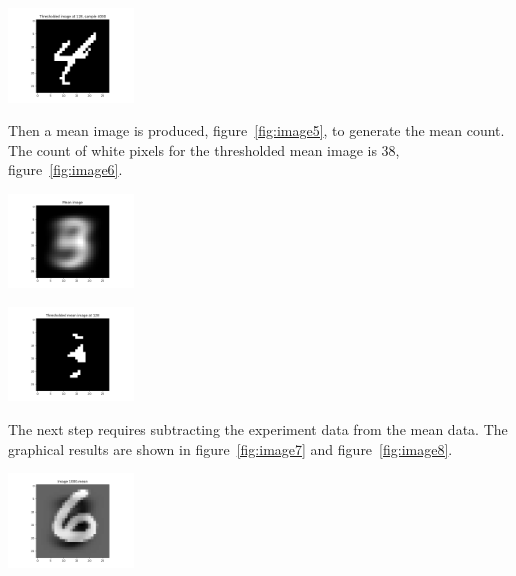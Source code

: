 \begin{center}
\includegraphics[width=0.25\textwidth]{image4.png}
\end{center}

Then a mean image is produced, figure~\ref{fig:image5}, to generate the mean count.
The count of white pixels for the thresholded mean image is 38, figure~\ref{fig:image6}.

\begin{center}
\includegraphics[width=0.25\textwidth]{image5.png}
\end{center}

\begin{center}
\includegraphics[width=0.25\textwidth]{image6.png}
\end{center}

The next step requires subtracting the experiment data from the mean data. The graphical results are shown in figure~\ref{fig:image7} and figure~\ref{fig:image8}.

\begin{center}
\includegraphics[width=0.25\textwidth]{image7.png}
\end{center}

